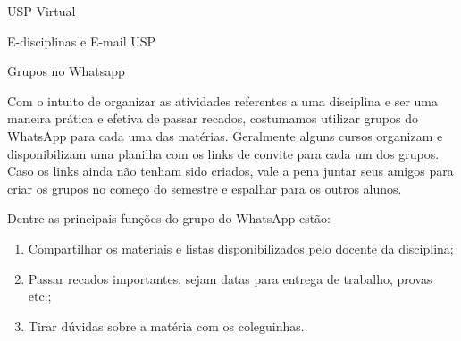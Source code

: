 \begin{secao}{USP Virtual}
\begin{subsecao}{E-disciplinas e E-mail USP}
%
%
%
\end{subsecao}

\begin{subsecao}{Grupos no Whatsapp}

Com o intuito de organizar as atividades referentes a uma disciplina e ser uma
maneira prática e efetiva de passar recados, costumamos utilizar grupos do WhatsApp
para cada uma das matérias. Geralmente alguns cursos organizam e disponibilizam uma planilha
com os links de convite para cada um dos grupos. Caso os links ainda não tenham sido criados,
vale a pena juntar seus amigos para criar os grupos no começo do semestre e espalhar
para os outros alunos.

Dentre as principais funções do grupo do WhatsApp estão:

\begin{enumerate}
\item Compartilhar os materiais e listas disponibilizados pelo docente da disciplina;
\item Passar recados importantes, sejam datas para entrega de trabalho, provas etc.;
\item Tirar dúvidas sobre a matéria com os coleguinhas.
\end{enumerate}


\end{subsecao}
\end{secao}
